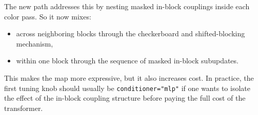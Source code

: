 \documentclass[11pt]{article}
\begin{document}
The new path addresses this by nesting masked in-block couplings inside each
color pass. So it now mixes:
\begin{itemize}
\item across neighboring blocks through the checkerboard and shifted-blocking
mechanism,
\item within one block through the sequence of masked in-block subupdates.
\end{itemize}

This makes the map more expressive, but it also increases cost. In practice,
the first tuning knob should usually be \texttt{conditioner="mlp"} if one wants
to isolate the effect of the in-block coupling structure before paying the full
cost of the transformer.
\end{document}
